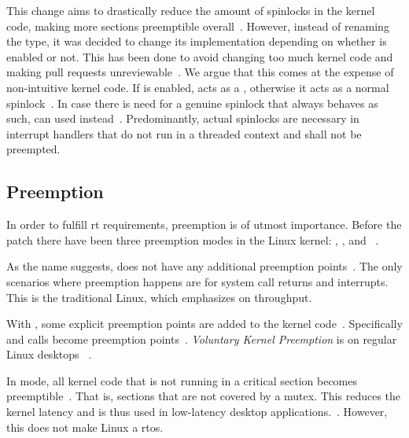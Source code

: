 \documentclass[10pt,twocolumn,a4paper]{article}
\begin{document}
\noindent This change aims to drastically reduce the amount of spinlocks in the kernel code, making more sections preemptible overall~\cite{lf:sleeping-spinlocks}.
However, instead of renaming the type, it was decided to change its implementation depending on whether  is enabled or not.
This has been done to avoid changing too much kernel code and making pull requests unreviewable~\cite{reghenzani_realtime_2019}.
We argue that this comes at the expense of non-intuitive kernel code.
If  is enabled,  acts as a , otherwise it acts as a normal spinlock~\cite{mckenney_realtime_2005}.
In case there is need for a genuine spinlock that always behaves as such,  can used instead~\cite{mckenney_realtime_2005, chyyuu_github_2017}.
Predominantly, actual spinlocks are necessary in interrupt handlers that do not run in a threaded context and shall not be preempted.


\subsection{Preemption}\label{subsec:preemption}
In order to fulfill \acrshort{rt} requirements, preemption is of utmost importance.
Before the  patch there have been three preemption modes in the Linux kernel: , , and ~\cite{lf:preemption,kernel_preemption_modes}.

As the name suggests,  does not have any additional preemption points~\cite{kernel_preemption_modes}.
The only scenarios where preemption happens are for system call returns and interrupts.
This is the traditional Linux, which emphasizes on throughput.

With , some explicit preemption points are added to the kernel code~\cite{kernel_preemption_modes}.
Specifically  and  calls become preemption points~\cite{day_re_2007}.
\emph{Voluntary Kernel Preemption} is on regular Linux desktops ~\cite{mckenney_realtime_2005}.

In  mode, all kernel code that is not running in a critical section becomes preemptible~\cite{kernel_preemption_modes}.
That is, sections that are not covered by a mutex.
This reduces the kernel latency and is thus used in low-latency desktop applications.~\cite{mckenney_realtime_2005}.
However, this does not make Linux a \acrshort{rtos}.
\newline
\end{document}
